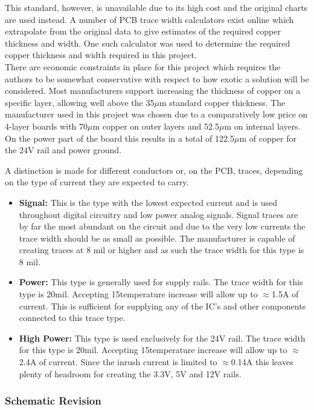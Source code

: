 This standard, however, is unavailable due to its high cost and the original charts are used instead.
A number of PCB trace width calculators exist online which extrapolate from the original data to give estimates of the required copper thickness and width.
One such calculator \cite{pcb_trace_calc} was used to determine the required copper thickness and width required in this project.
~\\
There are economic constraints in place for this project which requires the authors to be somewhat conservative with respect to how exotic a solution will be considered.
Most manufacturers support increasing the thickness of copper on a specific layer, allowing well above the 35$\mu$m standard copper thickness.
The manufacturer used in this project was chosen due to a comparatively low price on 4-layer boards with 70$\mu$m copper on outer layers and 52.5$\mu$m on internal layers.
On the power part of the board this results in a total of 122.5$\mu$m of copper for the 24V rail and power ground.

A distinction is made for different conductors or, on the PCB, traces, depending on the type of current they are expected to carry.
\begin{itemize}
	\item \textbf{Signal:} This is the type with the lowest expected current and is used throughout digital circuitry and low power analog signals.
	Signal traces are by far the most abundant on the circuit and due to the very low currents the trace width should be as small as possible.
	The manufacturer is capable of creating traces at 8 mil or higher and as such the trace width for this type is 8 mil.
	\item \textbf{Power:} This type is generally used for supply rails.
	The trace width for this type is 20mil. Accepting 15\degree temperature increase will allow up to $\approx$1.5A of current.
	This is sufficient for supplying any of the IC's and other components connected to this trace type.
	\item \textbf{High Power:} This type is used exclusively for the 24V rail.
	The trace width for this type is 20mil. Accepting 15\degree temperature increase will allow up to $\approx$2.4A of current.
	Since the inrush current is limited to $\approx$0.14A this leaves plenty of headroom for creating the 3.3V, 5V and 12V rails.
\end{itemize}



\subsubsection{Schematic Revision} %
\label{ssub:schematic_revision}

